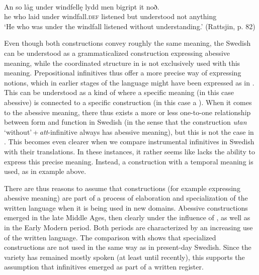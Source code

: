 \documentclass[output=paper]{langscibook}
\begin{document}
\ex {}\\
\gll An so låg under windfellę lydd men bigript it noð.\\
he who laid under windfall.\textsc{def} listened but understood not anything\\
\glt ‘He who was under the windfall listened without understanding.’ (Rattsjin, p. 82)
\z
\z


Even though both constructions convey roughly the same meaning, the Swedish  can be understood as a grammaticalized construction expressing abessive meaning, while the coordinated structure in  is not exclusively used with this meaning. Prepositional infinitives thus offer a more precise way of expressing  notions, which in earlier stages of the language might have been expressed as in . This can be understood as a kind of  where a specific meaning (in this case abessive) is connected to a specific construction (in this case a ). When it comes to the abessive meaning, there thus exists a more or less one-to-one relationship between form and function in Swedish (in the sense that the construction \textit{utan} ‘without’\,+\,\textit{att}-infinitive always has abessive meaning), but this is not the case in . This becomes even clearer when we compare instrumental infinitives in Swedish with their  translations. In these instances, it rather seems like  lacks the ability to express this precise meaning. Instead, a construction with a temporal meaning is used, as in example  above. 



There are thus reasons to assume that  constructions (for example expressing abessive meaning) are part of a process of elaboration and specialization of the written language when it is being used in new domains. Abessive constructions emerged in the late Middle Ages, then clearly under the influence of , as well as in the Early Modern period. Both periods are characterized by an increasing use of the written language. The comparison with  shows that specialized  constructions are not used in the same way as in present-day Swedish. Since the variety has remained mostly spoken (at least until recently), this supports the assumption that  infinitives emerged as part of a written register.  
\end{document}
